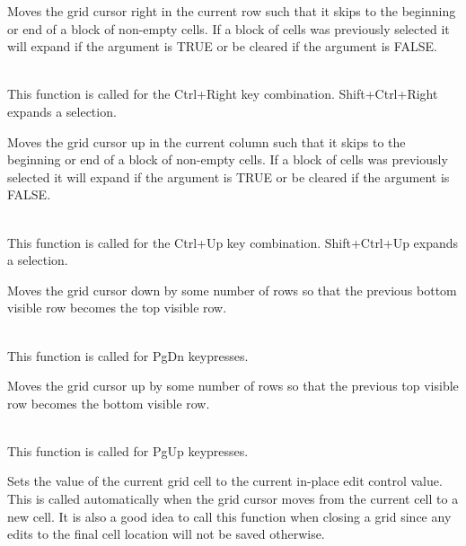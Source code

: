 \label{wxgridmovecursorrightblock}


Moves the grid cursor right in the current row such that it skips to the beginning or
end of a block of non-empty cells. If a block of cells was previously selected it
will expand if the argument is TRUE or be cleared if the argument is FALSE.

\\
This function is called for the Ctrl+Right key combination. Shift+Ctrl+Right expands a selection.

\label{wxgridmovecursorupblock}


Moves the grid cursor up in the current column such that it skips to the beginning or
end of a block of non-empty cells. If a block of cells was previously selected it
will expand if the argument is TRUE or be cleared if the argument is FALSE.

\\
This function is called for the Ctrl+Up key combination. Shift+Ctrl+Up expands a selection.

\label{wxgridmovepagedown}


Moves the grid cursor down by some number of rows so that the previous bottom visible row
becomes the top visible row.

\\
This function is called for PgDn keypresses.

\label{wxgridmovepageup}


Moves the grid cursor up by some number of rows so that the previous top visible row
becomes the bottom visible row.

\\
This function is called for PgUp keypresses.

\label{wxgridsaveeditcontrolvalue}


Sets the value of the current grid cell to the current in-place edit control value.
This is called automatically when the grid cursor moves from the current cell to a
new cell. It is also a good idea to call this function when closing a grid since
any edits to the final cell location will not be saved otherwise.

